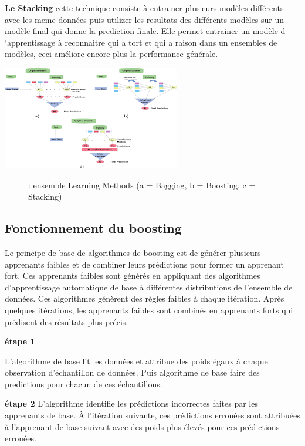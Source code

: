\documentclass[french,a4paper,12pt]{article}
\begin{document}
\textbf{Le Stacking}
\quad cette technique consiste à entrainer plusieurs modèles différents avec les meme données puis utilizer les resultats des différents modèles  sur un modèle final qui donne la prediction finale. Elle permet entrainer un modèle d ‘apprentissage à reconnaitre qui a tort et qui a raison dans un ensembles de modèles, ceci améliore encore plus la performance générale. 


 \begin{center}
\includegraphics[scale=1]{Techniques ensembles learning.png}
\begin{figure}[h]
\caption{: ensemble Learning Methods (a = Bagging, b = Boosting, c = Stacking)}
\end{figure}
\end{center}

\subsection{Fonctionnement du boosting}
\quad Le principe de base de algorithmes de boosting est de générer plusieurs apprenants faibles et de combiner leurs prédictions pour former un apprenant fort. Ces apprenants faibles sont générés en appliquant des algorithmes d'apprentissage automatique de base à différentes distributions de l'ensemble de données. Ces algorithmes génèrent des règles faibles à chaque itération. Après quelques itérations, les apprenants faibles sont combinés en apprenants forts qui prédisent des résultats plus précis.



\textbf{étape 1}

 \quad L'algorithme de base lit les données et attribue des poids égaux à chaque observation d'échantillon de données. Puis algorithme de base faire des predictions pour chacun de ces échantillons.
 
 \textbf{étape 2}
 \quad L’algorithme identifie les prédictions incorrectes faites par les apprenants de base. À l'itération suivante, ces prédictions erronées sont attribuées à l'apprenant de base suivant avec des poids plus élevés pour ces prédictions erronées.
\end{document}
